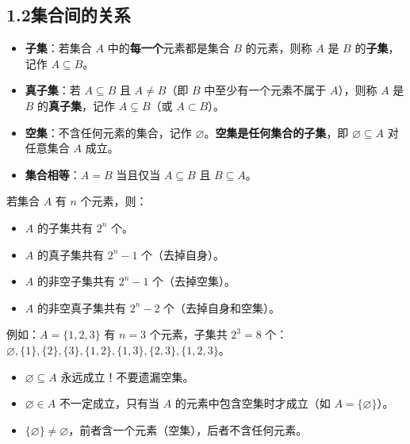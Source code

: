 \documentclass[12pt, a4paper]{ctexart}
\begin{document}
\subsection*{1.2\quad 集合间的关系}

\begin{knowledgebox}[子集与真子集]
\begin{itemize}[leftmargin=2em]
  \item \textbf{子集}：若集合 $A$ 中的\textbf{每一个}元素都是集合 $B$ 的元素，则称 $A$ 是 $B$ 的\textbf{子集}，记作 $A \subseteq B$。
  \item \textbf{真子集}：若 $A \subseteq B$ 且 $A \neq B$（即 $B$ 中至少有一个元素不属于 $A$），则称 $A$ 是 $B$ 的\textbf{真子集}，记作 $A \subsetneq B$（或 $A \subset B$）。
  \item \textbf{空集}：不含任何元素的集合，记作 $\varnothing$。\textbf{空集是任何集合的子集}，即 $\varnothing \subseteq A$ 对任意集合 $A$ 成立。
  \item \textbf{集合相等}：$A = B$ 当且仅当 $A \subseteq B$ 且 $B \subseteq A$。
\end{itemize}
\end{knowledgebox}

\begin{tipbox}[子集个数规律]
若集合 $A$ 有 $n$ 个元素，则：
\begin{itemize}[leftmargin=2em]
  \item $A$ 的子集共有 $2^n$ 个。
  \item $A$ 的真子集共有 $2^n - 1$ 个（去掉自身）。
  \item $A$ 的非空子集共有 $2^n - 1$ 个（去掉空集）。
  \item $A$ 的非空真子集共有 $2^n - 2$ 个（去掉自身和空集）。
\end{itemize}
例如：$A = \{1, 2, 3\}$ 有 $n = 3$ 个元素，子集共 $2^3 = 8$ 个：$\varnothing, \{1\}, \{2\}, \{3\}, \{1,2\}, \{1,3\}, \{2,3\}, \{1,2,3\}$。
\end{tipbox}

\begin{warnbox}[易错提醒：空集]
\begin{itemize}[leftmargin=2em]
  \item $\varnothing \subseteq A$ 永远成立！不要遗漏空集。
  \item $\varnothing \in A$ 不一定成立，只有当 $A$ 的元素中包含空集时才成立（如 $A = \{\varnothing\}$）。
  \item $\{\varnothing\} \neq \varnothing$，前者含一个元素（空集），后者不含任何元素。
\end{itemize}
\end{warnbox}
\end{document}
